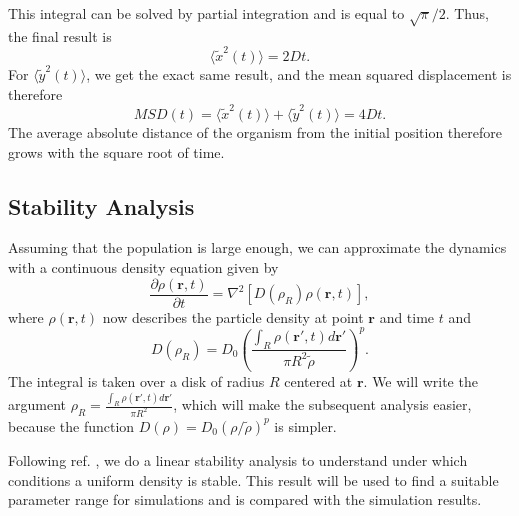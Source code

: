 \documentclass{article}
\renewcommand{\vec}[1]{\boldsymbol{#1}}
\begin{document}
This integral can be solved by partial integration and is equal to $\sqrt{\pi}/2$.
Thus, the final result is 
\begin{equation*}
    \langle \tilde{x}^2(t)\rangle = 2Dt.
\end{equation*}
For $\langle \tilde{y}^2(t)\rangle$, we get the exact same result, and the mean squared displacement is therefore
\begin{equation*}
    MSD(t) = \langle \tilde{x}^2(t)\rangle + \langle \tilde{y}^2(t)\rangle  = 4Dt.
\end{equation*}
The average absolute distance of the organism from the initial position therefore grows with the square root of time.



\subsection{Stability Analysis}
Assuming that the population is large enough, we can approximate the dynamics with a continuous density equation given by
\begin{equation}
    \frac{\partial\rho(\vec{r},t)}{\partial t} = \nabla^2[D(\rho_R)\rho(\vec{r},t)],
\end{equation}
where $\rho(\vec{r},t)$ now describes the particle density at point $\vec{r}$ and time $t$ and
\begin{equation}
    D(\rho_R) = D_0 \left(\frac{\int_{R} \rho(\vec{r}',t)d\vec{r}'}{\pi R^2 \tilde{\rho}}\right)^p.
\end{equation}
The integral is taken over a disk of radius $R$ centered at $\vec{r}$. 
We will write the argument $\rho_R = \frac{\int_{R} \rho(\vec{r}',t)d\vec{r}'}{\pi R^2}$, which will make the subsequent analysis easier, because the function $D(\rho)=D_0 (\rho/\tilde{\rho})^p$ is simpler.

Following ref. \cite{lopezMacroscopicDescriptionParticle2006}, we do a linear stability analysis to understand under which conditions a uniform density is stable. 
This result will be used to find a suitable parameter range for simulations and is compared with the simulation results.
\end{document}
